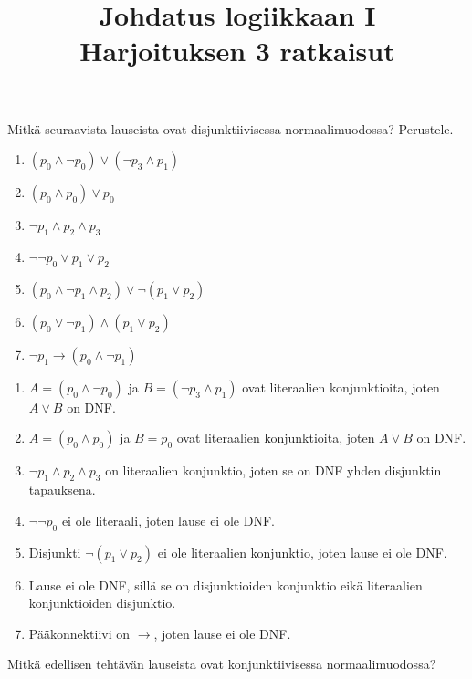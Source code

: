 \documentclass[11pt,a4paper]{amsart}
\title{Johdatus logiikkaan I\\Harjoituksen 3 ratkaisut}
\author{}
\date{}
\begin{document}

\begin{exercise}
  Mitkä seuraavista lauseista ovat disjunktiivisessa
  normaalimuodossa? Perustele.
\begin{enumerate}[label=\alph*), nosep]
  \item \((p_0 \land \neg p_0) \lor (\neg p_3 \land p_1)\)
  \item \((p_0 \land p_0) \lor p_0\)
  \item \(\neg p_1 \land p_2 \land p_3\)
  \item \(\neg\neg p_0 \lor p_1 \lor p_2\)
  \item \((p_0 \land \neg p_1 \land p_2) \lor \neg(p_1 \lor p_2)\)
  \item \((p_0 \lor \neg p_1) \land (p_1 \lor p_2)\)
  \item \(\neg p_1 \rightarrow (p_0 \land \neg p_1)\)
\end{enumerate}
\end{exercise}

\begin{solution}
\leavevmode\par
\begin{enumerate}[label=\alph*), nosep]
\item \(A = (p_0 \land \neg p_0)\) ja \(B = (\neg p_3 \land p_1)\) ovat
  literaalien konjunktioita, joten \(A \lor B\) on DNF.
\item \(A = (p_0 \land p_0)\) ja \(B = p_0\) ovat literaalien konjunktioita,
  joten \(A \lor B\) on DNF.
\item \(\neg p_1 \land p_2 \land p_3\) on literaalien konjunktio, joten se
  on DNF yhden disjunktin tapauksena.
\item \(\neg \neg p_0\) ei ole literaali, joten lause ei ole DNF.
\item Disjunkti \(\neg(p_1 \lor p_2)\) ei ole literaalien konjunktio, joten
  lause ei ole DNF.
\item Lause ei ole DNF, sillä se on disjunktioiden konjunktio eikä
  literaalien konjunktioiden disjunktio.
\item Pääkonnektiivi on \(\to\), joten lause ei ole DNF.
\end{enumerate}
\end{solution}

\begin{exercise}
Mitkä edellisen tehtävän lauseista ovat konjunktiivisessa normaalimuodossa?
\end{exercise}
\end{document}
